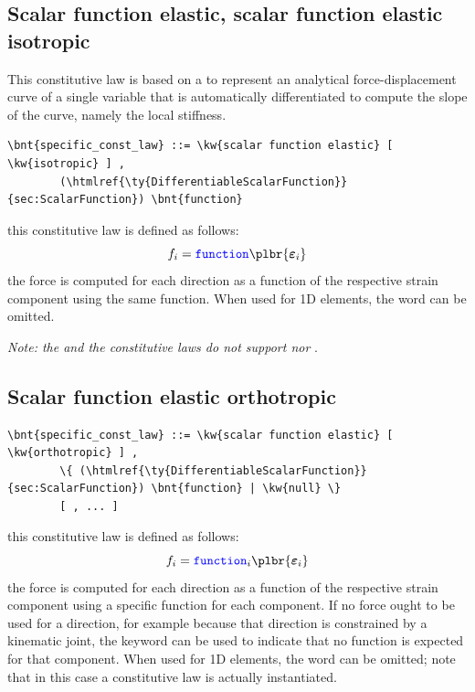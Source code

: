 \subsection{Scalar function elastic, scalar function elastic isotropic}
This constitutive law is based on a 
to represent an analytical force-displacement curve 
of a single variable that is automatically differentiated 
to compute the slope of the curve, namely the local stiffness.
\begin{Verbatim}[commandchars=\\\{\}]
    \bnt{specific_const_law} ::= \kw{scalar function elastic} [ \kw{isotropic} ] ,
        (\htmlref{\ty{DifferentiableScalarFunction}}{sec:ScalarFunction}) \bnt{function}
\end{Verbatim}
this constitutive law is defined as follows:
\begin{displaymath}
	f_i = \nt{function}\plbr{\T{\varepsilon}_i}
\end{displaymath}
the force is computed for each direction as a function of the respective
strain component using the same function.
When used for 1D elements, the word  can be omitted.

\bigskip
\noindent
\emph{Note: the  and the  constitutive laws do not support  nor }.

\subsection{Scalar function elastic orthotropic}
\begin{Verbatim}[commandchars=\\\{\}]
    \bnt{specific_const_law} ::= \kw{scalar function elastic} [ \kw{orthotropic} ] ,
        \{ (\htmlref{\ty{DifferentiableScalarFunction}}{sec:ScalarFunction}) \bnt{function} | \kw{null} \}
        [ , ... ]
\end{Verbatim}
this constitutive law is defined as follows:
\begin{displaymath}
	f_i = \nt{function}_i \plbr{\T{\varepsilon}_i}
\end{displaymath}
the force is computed for each direction as a function of the respective
strain component using a specific function for each component.
If no force ought to be used for a direction, for example because 
that direction is constrained by a kinematic joint, the keyword 
can be used to indicate that no function is expected for that component.
When used for 1D elements, the word  can be omitted;
note that in this case a 
constitutive law is actually instantiated.

